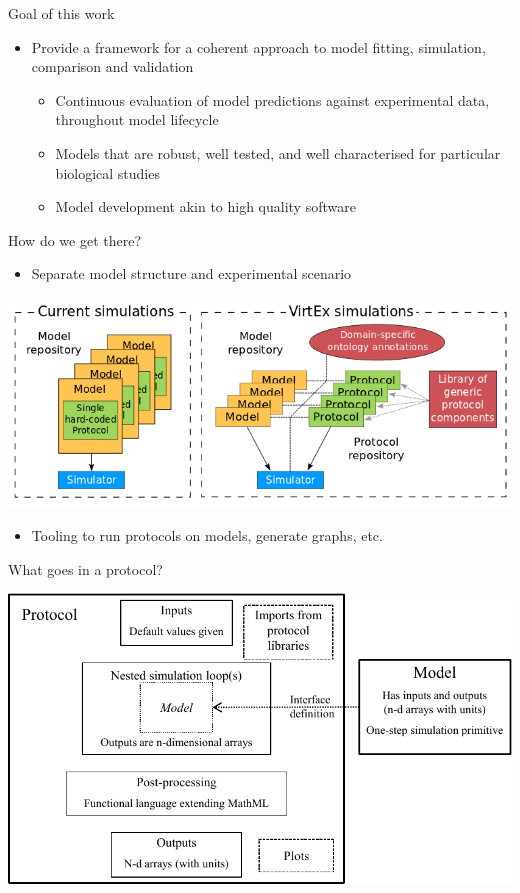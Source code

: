 \documentclass[t,xcolor={usenames,dvipsnames}]{beamer}
\newcommand{\subitem}[1]{\begin{itemize}[<.->]\item #1 \end{itemize}}
\begin{document}
\begin{frame}{Goal of this work}
\begin{itemize}
\item Provide a framework for a coherent approach to model fitting, simulation, comparison and validation
  \begin{itemize}
  \item Continuous evaluation of model predictions against experimental data, throughout model lifecycle
  \item Models that are robust, well tested, and well characterised for particular biological studies
  \item Model development akin to high quality software
  \end{itemize}
\end{itemize}
\end{frame}


\begin{frame}{How do we get there?}
\subitem{Separate \alert{model structure} and \alert{experimental scenario}}
\begin{center}
\includegraphics[width=.9\textwidth]{VirtEx_overview}
\end{center}
\subitem{Tooling to run protocols on models, generate graphs, etc.}
\end{frame}


\begin{frame}{What goes in a protocol?}
\begin{center}
\includegraphics[width=\textwidth]{protocol_language}
\end{center}
\end{frame}
\end{document}
